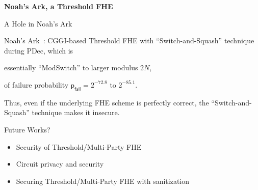 \documentclass{beamer}
\begin{document}
    \begin{frame}{}
    \begin{center}
        {\Large \bf Noah's Ark, a Threshold FHE}
    \end{center} 
    \end{frame}   
    
	\begin{frame}{A Hole in Noah's Ark}

        Noah's Ark~\cite{cryptoeprint:2023/815}: CGGI-based Threshold FHE with ``Switch-and-Squash'' technique during PDec, which is
        \begin{center}
        essentially ``ModSwitch'' to larger modulus $2N$,
        \end{center}

        of failure probability $\mathsf{p}_\mathsf{fail} = 2^{-72.8}$ to $2^{-85.1}$.\vspace{0.3cm}\pause

        Thus, even if the underlying FHE scheme is perfectly correct, the ``Switch-and-Squash'' technique makes it insecure.
	\end{frame}
    
	\begin{frame}{Future Works?}

        \begin{itemize}
            \item Security of Threshold/Multi-Party FHE
            \item Circuit privacy and \indcpad security
            \item Securing Threshold/Multi-Party FHE with sanitization
        \end{itemize}
	\end{frame}
\end{document}
